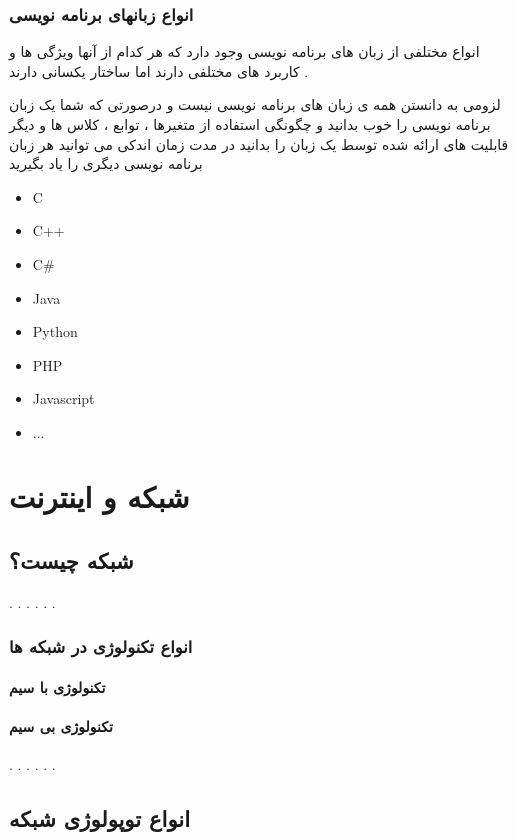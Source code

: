 \documentclass[12pt]{book}
\begin{document}
\subsection{انواع زبانهای برنامه نویسی}

انواع مختلفی از زبان های برنامه نویسی وجود دارد که هر کدام از آنها ویژگی ها و کاربرد های مختلفی دارند اما ساختار یکسانی دارند .

لزومی به دانستن همه ی زبان های برنامه نویسی نیست و درصورتی که شما یک زبان برنامه نویسی را خوب بدانید و چگونگی استفاده از متغیرها ، توابع ، کلاس ها و دیگر قابلیت های ارائه شده توسط یک زبان را بدانید در مدت زمان اندکی می توانید هر زبان برنامه نویسی دیگری را یاد بگیرید


\begin{latin}
\begin{itemize}
	\item C
	\item C++
	\item C\#
	\item Java
	\item Python
	\item PHP
	\item Javascript
	\item $\dots$
\end{itemize}
\end{latin}



\newpage
\chapter{شبکه و اینترنت}

\section{شبکه چیست؟}
. . . . . .
\subsection{انواع تکنولوژی در شبکه ها}
\subsubsection{تکنولوژی با سیم}
\subsubsection{تکنولوژی بی سیم}
. . . . . .
\section{انواع توپولوژی شبکه}
\end{document}
